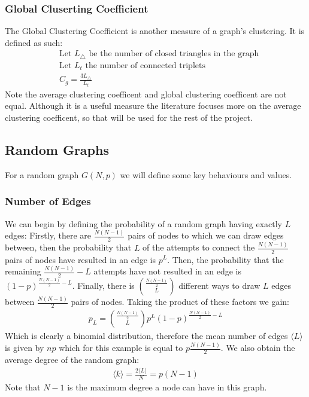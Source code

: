 \documentclass{article}
\begin{document}
        \subsubsection{Global Cluserting Coefficient}
        The Global Clustering Coefficient is another measure of a graph's clustering. It is defined as such:
        \begin{align*}
            &\text{Let $L_\triangle$ be the number of closed triangles in the graph}\\
            &\text{Let $L_t$ the number of connected triplets}\\
            &C_g = \frac{3L_\triangle}{L_t}
        \end{align*}
        Note the average clustering coefficent and global clustering coefficent are not equal. Although it is a useful measure the literature focuses more on the average clustering coefficent, so that will be used for the rest of the project.

        \subsection{Random Graphs}
        For a random graph $G(N,p)$ we will define some key behaviours and values.
            \subsubsection{Number of Edges}
            We can begin by defining the probability of a random graph having exactly $L$ edges:
            Firstly, there are $\frac{N(N-1)}{2}$ pairs of nodes to which we can draw edges between, then the probability that $L$ of the attempts to connect the $\frac{N(N-1)}{2}$ pairs of nodes have resulted in an edge is $p^L$. Then, the probability that the remaining  $\frac{N(N-1)}{2} -L$ attempts have not resulted in an edge is $(1-p)^{\frac{N(N-1)}{2} -L}$. Finally, there is $\binom{\frac{N(N-1)}{2}}{L}$ different ways to draw $L$ edges between $\frac{N(N-1)}{2}$ pairs of nodes. Taking the product of these factors we gain:
            \begin{align*}
                p_{L} = \binom{\frac{N(N-1)}{2}}{L}p^L(1-p)^{\frac{N(N-1)}{2} -L}
            \end{align*}
            Which is clearly a binomial distribution, therefore the mean number of edges $\langle L \rangle$ is given by $np$ which for this example is equal to $p\frac{N(N-1)}{2}$. We also obtain the average degree of the random graph:
            \begin{align*}
                \langle k \rangle = \frac{2 \langle L \rangle}{N} = p(N-1)
            \end{align*}
            Note that $N-1$ is the maximum degree a node can have in this graph.
\end{document}

